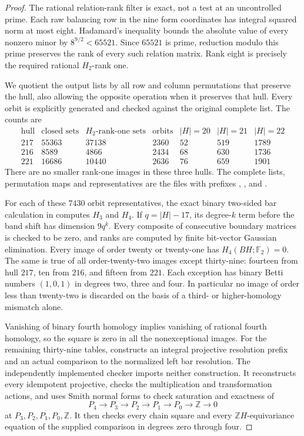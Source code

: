 \begin{proof}
The rational relation-rank filter is exact, not a test at an
uncontrolled prime.  Each raw balancing row in the nine form
coordinates has integral squared norm at most eight.  Hadamard's
inequality bounds the absolute value of every nonzero minor by
$8^{9/2}<65521$.  Since $65521$ is prime, reduction modulo this
prime preserves the rank of every such relation matrix.  Rank
eight is precisely the required rational $H_2$-rank one.

We quotient the output lists by all row and column permutations
that preserve the hull, also allowing the opposite operation
when it preserves that hull.  Every orbit is explicitly generated
and checked against the original complete list.  The counts are
\[
\begin{array}{c|r|r|r|rrr}
 \text{hull}&\text{closed sets}&H_2\text{-rank-one sets}
 &\text{orbits}&|H|=20&|H|=21&|H|=22\\\hline
 217&55363&37138&2360&52&519&1789\\
 216&8589&4866&2434&68&630&1736\\
 221&16686&10440&2636&76&659&1901
\end{array}
\]
There are no smaller rank-one images in these three hulls.
The complete lists, permutation maps and representatives are
the files with prefixes
,
, and
.

For each of these $7430$ orbit representatives, the exact binary
two-sided bar calculation in
 computes $H_3$ and $H_4$.
If $q=|H|-17$, its degree-$k$ term before the band shift has
dimension $9q^k$.  Every composite of consecutive boundary
matrices is checked to be zero, and ranks are computed by
finite bit-vector Gaussian elimination.  Every image of order
twenty or twenty-one has $H_4(BH;\mathbb F_2)=0$.
The same is true of all order-twenty-two images except thirty-nine:
fourteen from hull $217$, ten from $216$, and fifteen from
$221$.  Each exception has binary Betti numbers $(1,0,1)$ in
degrees two, three and four.  In particular no image of order
less than twenty-two is discarded on the basis of a third- or
higher-homology mismatch alone.

Vanishing of binary fourth homology implies vanishing of
rational fourth homology, so the square is zero in all the
nonexceptional images.  For the remaining thirty-nine tables,
 constructs an integral
projective resolution prefix and an actual comparison to the
normalized left bar resolution.  The independently implemented
checker  imports neither
construction.  It reconstructs every idempotent projective,
checks the multiplication and transformation actions, and uses
Smith normal forms to check saturation and exactness of
\[
 P_4\longrightarrow P_3\longrightarrow P_2
 \longrightarrow P_1\longrightarrow P_0
 \longrightarrow\mathbb Z\longrightarrow0
\]
at $P_3,P_2,P_1,P_0,\mathbb Z$.  It then checks every chain
square and every $\mathbb ZH$-equivariance equation of the
supplied comparison in degrees zero through four.


\end{proof}
